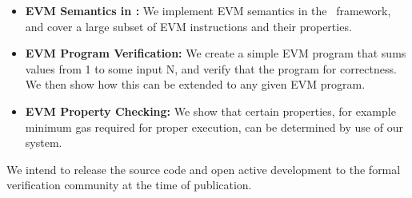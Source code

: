 \begin{itemize}
\item{\bf EVM Semantics in \K{}:} We implement EVM semantics in the \K{}~framework, and
cover a large subset of EVM instructions and their properties.
\item{\bf EVM Program Verification:} We create a simple EVM program that sums
values from 1 to some input N, and verify that the program for correctness. We then show how this can be extended to any given EVM program.
\item{\bf EVM Property Checking:} We show that certain properties, for example
minimum gas required for proper execution, can be determined by use of our system.
\end{itemize}

We intend to release the source code and open active development to the formal
verification community at the time of publication.

